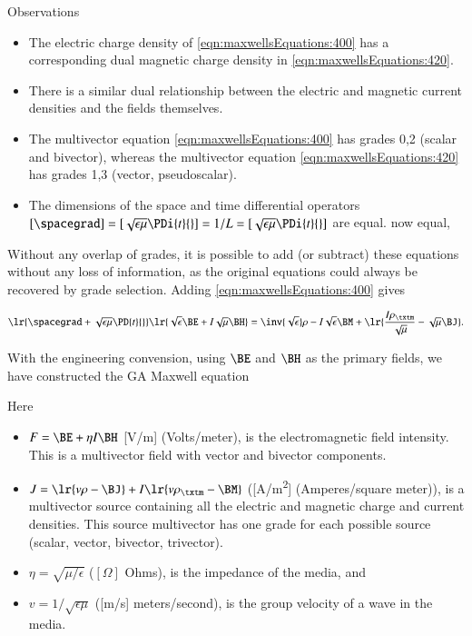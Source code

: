 Observations
\begin{itemize}
\item
The electric charge density of \cref{eqn:maxwellsEquations:400} has a corresponding dual magnetic charge density in \cref{eqn:maxwellsEquations:420}.  
\item
There is a similar dual relationship between the electric and magnetic current densities and the fields themselves.
\item
The multivector equation \cref{eqn:maxwellsEquations:400} has grades 0,2 (scalar and bivector), whereas the multivector equation \cref{eqn:maxwellsEquations:420} has grades 1,3 (vector, pseudoscalar).  
\item
The 
dimensions of the space and time differential operators \( [\spacegrad] = [\sqrt{\epsilon\mu} \PDi{t}{}] = 1/L = [\sqrt{\epsilon\mu}\PDi{t}{}]\) are equal.
now equal,
\end{itemize}

Without any overlap of grades, it is possible to add (or subtract) these equations without any loss of information, as
the original equations could always be recovered by grade selection.
Adding \cref{eqn:maxwellsEquations:400} gives

\begin{dmath}\label{eqn:maxwellsEquations:440}
\lr{ \spacegrad + \sqrt{\epsilon\mu} \PD{t}{} }
\lr{ \sqrt{\epsilon} \BE
+
I \sqrt{\mu} \BH
}
=
\inv{\sqrt{\epsilon}} \rho
- I \sqrt{\epsilon} \BM
+\lr{
\frac{I \rho_\txtm}{\sqrt{\mu}}
- \sqrt{\mu} \BJ
}
.
\end{dmath}

With the engineering convension, using \( \BE \) and \( \BH \) as the primary fields, we have constructed the GA Maxwell equation


Here

\begin{itemize}
\item \( F = \BE + \eta I \BH \) [\si{V/m}] (Volts/meter), is the electromagnetic field intensity.  This is a multivector field with vector and bivector components.
\item \( J = \lr{ v \rho - \BJ } + I \lr{ v \rho_\txtm - \BM } \) ([\si{A/m^2}] (Amperes/square meter)), 
is a multivector source containing all the electric and magnetic charge and current densities.  This source multivector has one grade for each possible source (scalar, vector, bivector, trivector).
\item \( \eta = \sqrt{\mu/\epsilon} \) (\( [\Omega] \) Ohms), is the impedance of the media, and
\item \( v = 1/\sqrt{\epsilon\mu} \) ([\si{m/s}] meters/second), is the group velocity of a wave in the media.
\end{itemize}

